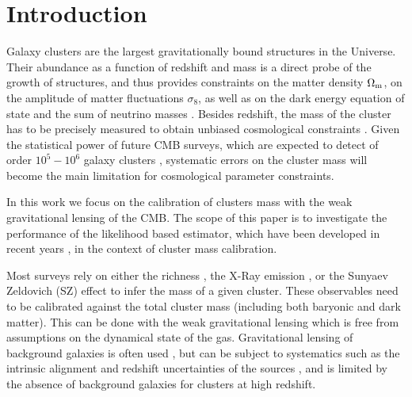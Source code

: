 \documentclass[prd, superscriptaddress, tightenlines, longbibliography, nofootinbib, eqsecnum, amsfonts, amsmath, floatfix, twocolumn, notitlepage]{revtex4-2}
\begin{document}
\tableofcontents
\section{Introduction}
\setcounter{footnote}{0}

Galaxy clusters are the largest gravitationally bound structures in the Universe. Their abundance as a function of redshift and mass is a direct probe of the growth of structures, and thus provides constraints on the matter density $\Omega_{\rm m}$, on the amplitude of matter fluctuations $\sigma_8$, as well as on the dark energy equation of state and the sum of neutrino masses \cite{Vikhlinin:2008ym,Sehgal:2010ca,Allen:2011zs,Planck:2013lkt, Mantz:2014xba,Mantz:2014paa, Planck:2015lwi,SPT:2016izt, SPT:2018njh}. Besides redshift, the mass of the cluster has to be precisely measured to obtain unbiased cosmological constraints \cite{Pratt:2019cnf, Salvati:2020exw, Salvati:2021gkt}. Given the statistical power of future CMB surveys, which are expected to detect of order $10^5 - 10^6$ galaxy clusters \cite{Madhavacheril:2017onh, SimonsObservatory:2018koc, CMB-S4:2016ple}, systematic errors on the cluster mass will become the main limitation for cosmological parameter constraints. 

In this work we focus on the calibration of clusters mass with the weak gravitational lensing of the CMB. 
The scope of this paper is to investigate the performance of the likelihood based estimator, which have been developed in recent years \cite{Carron:2017mqf}, in the context of cluster mass calibration. 

Most surveys rely on either the richness \cite[e.g.][]{Koester:2007bj,DES:2015mqu,Andreon:2016eck, Farahi:2016xux,Simet:2016mzg}, the X-Ray emission \cite[e.g.][]{Arnaud:2005ur, Arnaud:2007br, Vikhlinin:2008ym}, or the Sunyaev Zeldovich (SZ) effect \cite[e.g.][]{Vanderlinde:2010eb, Planck:2013lkt,Planck:2015lwi} to infer the mass of a given cluster. These observables need to be calibrated against the total cluster mass (including both baryonic and dark matter). This can be done with the weak gravitational lensing which is free from assumptions on the dynamical state of the gas.
Gravitational lensing of background galaxies is often used \cite{vonderLinden:2014haa, Hoekstra:2015gda, Smith:2015qhs, Sereno:2017zcn, Penna-Lima:2016tvo, Bellagamba:2018gec,Miyatake:2018lpb, Umetsu:2020wlf}, but can be subject to systematics such as the intrinsic alignment and  redshift uncertainties of the sources \cite{Becker:2010xj}, and is limited by the absence of background galaxies for clusters at high redshift. 
\end{document}
